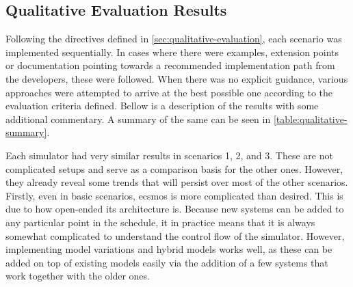 \documentclass[twoside, 11pt]{article}
\begin{document}






\subsection{Qualitative Evaluation Results}

Following the directives defined in \autoref{sec:qualitative-evaluation}, each scenario was implemented sequentially. In cases where there were examples, extension points or documentation pointing towards a recommended implementation path from the developers, these were followed. When there was no explicit guidance, various approaches were attempted to arrive at the best possible one according to the evaluation criteria defined. Bellow is a description of the results with some additional commentary. A summary of the same can be seen in \autoref{table:qualitative-summary}.

Each simulator had very similar results in scenarios 1, 2, and 3. These are not complicated setups and serve as a comparison basis for the other ones. However, they already reveal some trends that will persist over most of the other scenarios. Firstly, even in basic scenarios, \gls{ecsmos} is more complicated than desired. This is due to how open-ended its architecture is. Because new systems can be added to any particular point in the schedule, it in practice means that it is always somewhat complicated to understand the control flow of the simulator. However, implementing model variations and hybrid models works well, as these can be added on top of existing models easily via the addition of a few systems that work together with the older ones.
\end{document}
